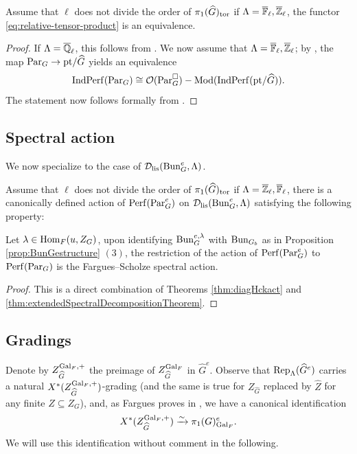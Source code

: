 \begin{thm}\label{thm:relative-tensor-product}
    Assume that $\ell$ does not divide the order of $\pi_1(\widehat{G})_{\textnormal{tor}}$ if $\Lambda = \overline{\mathbb{F}}_{\ell}, \overline{\mathbb{Z}}_{\ell}$, the functor \eqref{eq:relative-tensor-product} is an equivalence.
\end{thm}

\begin{proof}
    If $\Lambda = \overline{\mathbb{Q}}_{\ell}$, this follows from \cite[Theorem 4.7]{BenZviFrancisNadler}. We now assume that $\Lambda = \overline{\mathbb{F}}_{\ell}, \overline{\mathbb{Z}}_{\ell}$; by \cite[Theorem VIII.5.1]{Geometrization}, the map $\mathrm{Par}_G \to \mathrm{pt}/\widehat{G}$ yields an equivalence
    $$\mathrm{Ind}\mathrm{Perf}(\mathrm{Par}_G) \cong \mathcal{O}(\mathrm{Par}_G^{\square})-\mathrm{Mod}(\mathrm{Ind}\mathrm{Perf}(\mathrm{pt}/\widehat{G})).$$
    The statement now follows formally from \cite[Chapter 1, Corollary 8.5.7]{StudyInDerivedAlgGeomI}.
\end{proof}

\subsection{Spectral action}
We now specialize  to the case of $\mathcal{D}_{\textnormal{lis}}(\mathrm{Bun}_{G}^{e},\Lambda)$. 


\begin{thm}\label{thm:extended-spectral-action-on-bun_G}
    Assume that $\ell$ does not divide the order of $\pi_1(\widehat{G})_{\textnormal{tor}}$ if $\Lambda = \overline{\mathbb{Z}}_{\ell}, \overline{\mathbb{F}}_{\ell}$, there is a canonically defined action of $\mathrm{Perf}(\mathrm{Par}_G^e)$ on $\mathcal{D}_{\textnormal{lis}}(\mathrm{Bun}_{G}^{e},\Lambda)$ satisfying the following property: 
    
    Let $\lambda \in \mathrm{Hom}_F(u, Z_{G})$, upon identifying $\mathrm{Bun}_G^{e,\lambda}$ with $\mathrm{Bun}_{G_b}$ as in Proposition \ref{prop:BunGestructure} $(3)$, the restriction of the action of $\mathrm{Perf}(\mathrm{Par}_G^e)$ to $\mathrm{Perf}(\mathrm{Par}_G)$ is the Fargues--Scholze spectral action. 
\end{thm}


\begin{proof}
This is a direct combination of Theorems \ref{thm:diagHckact} and \ref{thm:extendedSpectralDecompositionTheorem}.
\end{proof}

\subsection{Gradings}
Denote by $Z_{\widehat{G}}^{\mathrm{Gal}_{F},+}$ the preimage of $Z_{\widehat{G}}^{\mathrm{Gal}_{F}}$ in $\widehat{G}^{e}$. Observe that $\mathrm{Rep}_{\Lambda}(\widehat{G}^{e})$ carries a natural $X^{*}(Z_{\widehat{G}}^{\mathrm{Gal}_{F},+})$-grading (and the same is true for $Z_{\widehat{G}}$ replaced by $\widehat{Z}$ for any finite $Z \subseteq Z_{G}$), and, as Fargues proves in \cite[\S 12]{Fargues22}, we have a canonical identification
\begin{equation*}
X^{*}(Z_{\widehat{G}}^{\mathrm{Gal}_{F},+}) \xrightarrow{\sim} \pi_{1}(G)^{e}_{\mathrm{Gal}_{F}}.
\end{equation*}
We will use this identification without comment in the following.


